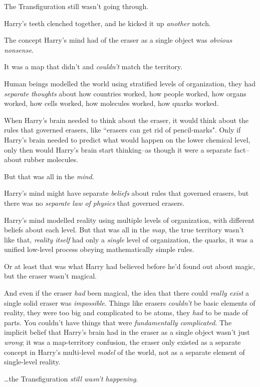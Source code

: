 The Transfiguration still wasn't going through.

Harry's teeth clenched together, and he kicked it up \emph{another} notch.

The concept Harry's mind had of the eraser as a single object was \emph{obvious nonsense}.

It was a map that didn't and \emph{couldn't} match the territory.

Human beings modelled the world using stratified levels of organization, they had \emph{separate thoughts} about how countries worked, how people worked, how organs worked, how cells worked, how molecules worked, how quarks worked.

When Harry's brain needed to think about the eraser, it would think about the rules that governed erasers, like ``erasers can get rid of pencil-marks". Only if Harry's brain needed to predict what would happen on the lower chemical level, only then would Harry's brain start thinking\---as though it were a separate fact\---about rubber molecules.

But that was all in the \emph{mind}.

Harry's mind might have separate \emph{beliefs} about rules that governed erasers, but there was no \emph{separate law of physics} that governed erasers.

Harry's mind modelled reality using multiple levels of organization, with different beliefs about each level. But that was all in the \emph{map}, the true territory wasn't like that, \emph{reality itself} had only a \emph{single} level of organization, the quarks, it was a unified low-level process obeying mathematically simple rules.

Or at least that was what Harry had believed before he'd found out about magic, but the eraser wasn't magical.

And even if the eraser \emph{had} been magical, the idea that there could \emph{really exist} a single solid eraser was \emph{impossible}. Things like erasers \emph{couldn't} be basic elements of reality, they were too big and complicated to be atoms, they \emph{had} to be made of parts. You couldn't have things that were \emph{fundamentally complicated}. The implicit belief that Harry's brain had in the eraser as a single object wasn't just \emph{wrong}; it was a map\--territory confusion, the eraser only existed as a separate concept in Harry's multi-level \emph{model} of the world, not as a separate element of single-level reality.

{\ldots}the Transfiguration \emph{still wasn't happening}.

